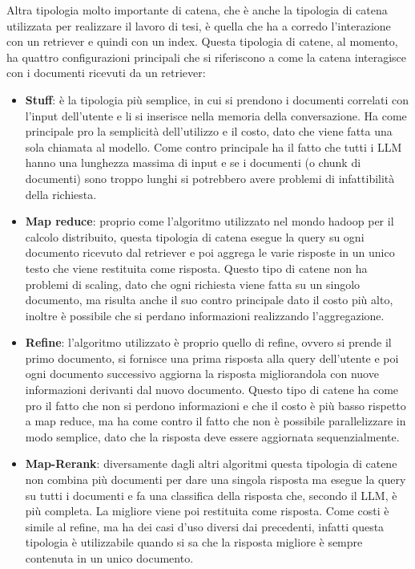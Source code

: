 Altra tipologia molto importante di catena, che è anche la tipologia di catena utilizzata per realizzare il lavoro di tesi, è quella che ha a corredo l'interazione con un retriever e quindi con un index.
Questa tipologia di catene, al momento, ha quattro configurazioni principali che si riferiscono a come la catena interagisce con i documenti ricevuti da un retriever:
\begin{itemize}
    \item \textbf{Stuff}: è la tipologia più semplice, in cui si prendono i documenti correlati con l'input dell'utente e li si inserisce nella memoria della conversazione. Ha come principale pro la semplicità dell'utilizzo e il costo, dato che viene fatta una sola chiamata al modello.
    Come contro principale ha il fatto che tutti i LLM hanno una lunghezza massima di input e se i documenti (o chunk di documenti) sono troppo lunghi si potrebbero avere problemi di infattibilità della richiesta. 
    \item \textbf{Map reduce}: proprio come l'algoritmo utilizzato nel mondo hadoop per il calcolo distribuito, questa tipologia di catena esegue la query su ogni documento ricevuto dal retriever e poi aggrega le varie risposte in un unico testo che viene restituita come risposta.
    Questo tipo di catene non ha problemi di scaling, dato che ogni richiesta viene fatta su un singolo documento, ma risulta anche il suo contro principale dato il costo più alto, inoltre è possibile che si perdano informazioni realizzando l'aggregazione.
    \item \textbf{Refine}: l'algoritmo utilizzato è proprio quello di refine, ovvero si prende il primo documento, si fornisce una prima risposta alla query dell'utente e poi ogni documento successivo aggiorna la risposta migliorandola con nuove informazioni derivanti dal nuovo documento.
    Questo tipo di catene ha come pro il fatto che non si perdono informazioni e che il costo è più basso rispetto a map reduce, ma ha come contro il fatto che non è possibile parallelizzare in modo semplice, dato che la risposta deve essere aggiornata sequenzialmente.
    \item \textbf{Map-Rerank}: diversamente dagli altri algoritmi questa tipologia di catene non combina più documenti per dare una singola risposta ma esegue la query su tutti i documenti e fa una classifica della risposta che, secondo il LLM, è più completa. La migliore viene poi restituita come risposta.
    Come costi è simile al refine, ma ha dei casi d'uso diversi dai precedenti, infatti questa tipologia è utilizzabile quando si sa che la risposta migliore è sempre contenuta in un unico documento. 
\end{itemize}